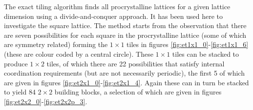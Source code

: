 The exact tiling algorithm finds all procrystalline lattices for a given lattice dimension using a divide\--and\--conquer approach.
It has been used here to investigate the square lattice.
The method starts from the observation that there are seven possibilities for each square in the procrystalline lattice (some of which are symmetry related) forming the $1\times 1$ tiles in figures \ref{fig:et1x1_0}\--\ref{fig:et1x1_6} (these are colour coded by a central circle).
These $1\times 1$ tiles can be stacked to produce $1\times 2$ tiles, of which there are 22 possibilities that satisfy internal coordination requirements (but are not necessarily periodic), the first 5 of which are given in figures \ref{fig:et2x1_0}\--\ref{fig:et2x1_4}.
Again these can in turn be stacked to yield 84 $2\times 2$ building blocks, a selection of which are given in figures \ref{fig:et2x2_0}\--\ref{fig:et2x2p_3}.

